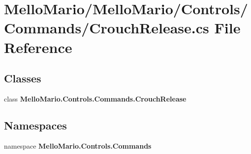 \section{Mello\+Mario/\+Mello\+Mario/\+Controls/\+Commands/\+Crouch\+Release.cs File Reference}
\label{CrouchRelease_8cs}
\subsection*{Classes}
\begin{DoxyCompactItemize}
\item 
class \textbf{ Mello\+Mario.\+Controls.\+Commands.\+Crouch\+Release}
\end{DoxyCompactItemize}
\subsection*{Namespaces}
\begin{DoxyCompactItemize}
\item 
namespace \textbf{ Mello\+Mario.\+Controls.\+Commands}
\end{DoxyCompactItemize}
